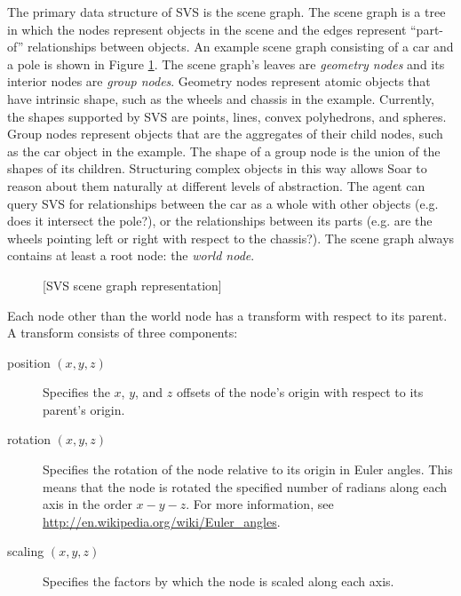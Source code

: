 The primary data structure of SVS is the scene graph.
The scene graph is a tree in which the nodes represent objects in the scene and the edges represent ``part-of'' relationships between objects.
An example scene graph consisting of a car and a pole is shown in Figure \ref{fig:scene-graph}.
The scene graph's leaves are \emph{geometry nodes} and its interior nodes are \emph{group nodes}.
Geometry nodes represent atomic objects that have intrinsic shape, such as the wheels and chassis in the example.
Currently, the shapes supported by SVS are points, lines, convex polyhedrons, and spheres.
Group nodes represent objects that are the aggregates of their child nodes, such as the car object in the example.
The shape of a group node is the union of the shapes of its children.
Structuring complex objects in this way allows Soar to reason about them naturally at different levels of abstraction.
The agent can query SVS for relationships between the car as a whole with other objects (e.g. does it intersect the pole?), or the relationships between its parts (e.g. are the wheels pointing left or right with respect to the chassis?).
The scene graph always contains at least a root node: the \emph{world node}.

\begin{figure}
	[SVS scene graph representation]
	\label{fig:scene-graph}
\end{figure}

Each node other than the world node has a transform with respect to its parent.
A transform consists of three components:

\vspace{-12pt}
\begin{description}
	\item[position $(x,y,z)$]
		Specifies the $x$, $y$, and $z$ offsets of the node's origin with respect to its parent's origin.
		\vspace{-6pt}
	\item[rotation $(x,y,z)$]
		Specifies the rotation of the node relative to its origin in Euler angles. This means that the node is rotated the specified number of radians along each axis in the order $x-y-z$. For more information, see \url{http://en.wikipedia.org/wiki/Euler_angles}.
		\vspace{-6pt}
	\item[scaling $(x,y,z)$]
		Specifies the factors by which the node is scaled along each axis.
		\vspace{-6pt}
\end{description}

